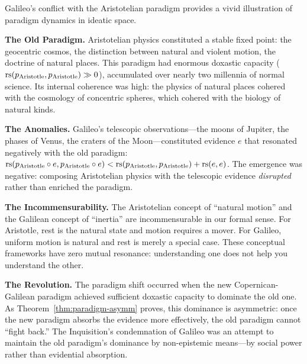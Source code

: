 \begin{remark}
Galileo's conflict with the Aristotelian paradigm provides a vivid illustration of
paradigm dynamics in ideatic space.

\textbf{The Old Paradigm.} Aristotelian physics constituted a stable fixed point:
the geocentric cosmos, the distinction between natural and violent motion, the
doctrine of natural places. This paradigm had enormous doxastic capacity
($\mathrm{rs}(p_{\text{Aristotle}}, p_{\text{Aristotle}}) \gg 0$), accumulated over
nearly two millennia of normal science. Its internal coherence was high:
the physics of natural places cohered with the cosmology of concentric spheres,
which cohered with the biology of natural kinds.

\textbf{The Anomalies.} Galileo's telescopic observations---the moons of Jupiter,
the phases of Venus, the craters of the Moon---constituted evidence $e$ that
resonated negatively with the old paradigm: $\mathrm{rs}(p_{\text{Aristotle}} \circ e,
p_{\text{Aristotle}} \circ e) < \mathrm{rs}(p_{\text{Aristotle}}, p_{\text{Aristotle}})
+ \mathrm{rs}(e, e)$. The emergence was negative: composing Aristotelian physics with
the telescopic evidence \emph{disrupted} rather than enriched the paradigm.

\textbf{The Incommensurability.} The Aristotelian concept of ``natural motion''
and the Galilean concept of ``inertia'' are incommensurable in our formal sense.
For Aristotle, rest is the natural state and motion requires a mover. For Galileo,
uniform motion is natural and rest is merely a special case. These conceptual
frameworks have zero mutual resonance: understanding one does not help you
understand the other.

\textbf{The Revolution.} The paradigm shift occurred when the new Copernican-Galilean
paradigm achieved sufficient doxastic capacity to dominate the old one. As
Theorem~\ref{thm:paradigm-asymm} proves, this dominance is asymmetric: once the
new paradigm absorbs the evidence more effectively, the old paradigm cannot
``fight back.'' The Inquisition's condemnation of Galileo was an attempt to
maintain the old paradigm's dominance by non-epistemic means---by social power
rather than evidential absorption.
\end{remark}

